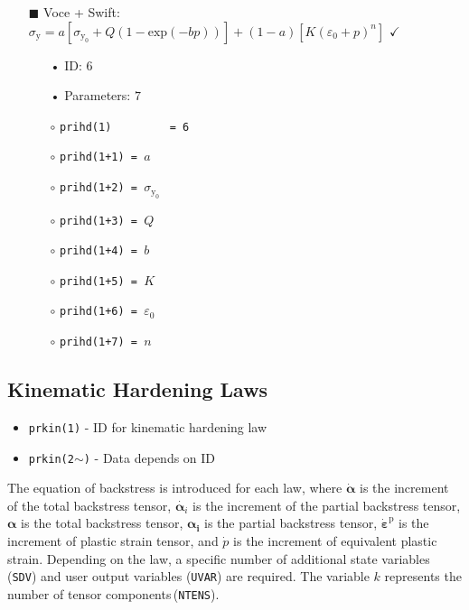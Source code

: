 \documentclass[11pt,a4paper,twoside,final,onecolumn,titlepage]{article}
\newcommand{\verified}{\hspace{0.5pt} {\LARGE $\checkmark$}}
\begin{document}
\newpage
\begin{itemize}
	\item[\tiny$\blacksquare$] Voce + Swift: $\displaystyle \sigma_{\textrm{y}} = a\left[\sigma_{\textrm{y}_0} + Q\left(1-\textrm{exp}(-bp)\right)\right]+ (1-a)\left[K(\varepsilon_0+p)^n\right]$ \verified{}
	\begin{itemize}
		\item[•] ID: $6$
		\item[•] Parameters: $7$\\
		\item[$\circ$] \texttt{prihd(1)\,\,\,\,\,\,\,\,\,= 6}
		\item[$\circ$] \texttt{prihd(1+1) = $a$}
		\item[$\circ$] \texttt{prihd(1+2) = $\sigma_{\textrm{y}_0} $}
		\item[$\circ$] \texttt{prihd(1+3) = $Q$}
		\item[$\circ$] \texttt{prihd(1+4) = $b$}
		\item[$\circ$] \texttt{prihd(1+5) = $K$}
		\item[$\circ$] \texttt{prihd(1+6) = $\varepsilon_0$}
		\item[$\circ$] \texttt{prihd(1+7) = $n$}
	\end{itemize}
\end{itemize}

\vspace{0.2cm}
\subsection{Kinematic Hardening Laws}
\vspace{0.2cm}

\begin{itemize}
	\item \texttt{prkin(1)} - ID for kinematic hardening law
	\item \texttt{prkin(2$\mathtt{\sim}$)} - Data depends on ID
\end{itemize}

\noindent The equation of backstress is introduced for each law, where $\dot{\bm{\alpha}}$ is the increment of the total backstress tensor, $\dot{\bm{\alpha}_i}$ is the increment of the partial backstress tensor, $\bm{\alpha}$ is the total backstress tensor, $\bm{\alpha_i}$ is the partial backstress tensor, $\dot{\bm{\varepsilon}}^\textrm{p}$ is the increment of plastic strain tensor, and $\dot{p}$ is the increment of equivalent plastic strain. Depending on the law, a specific number of additional state variables (\texttt{SDV}) and user output variables (\texttt{UVAR}) are required. The variable $k$ represents the number of tensor components\,(\texttt{NTENS}).
\vspace{0.1cm}
\end{document}

